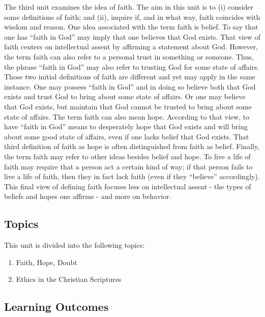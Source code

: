 \documentclass[
]{book}
\providecommand{\tightlist}{%
  \setlength{\itemsep}{0pt}\setlength{\parskip}{0pt}}
\begin{document}
The third unit examines the idea of faith. The aim in this unit is to (i) consider some definitions of faith; and (ii), inquire if, and in what way, faith coincides with wisdom and reason. One idea associated with the term faith is belief. To say that one has ``faith in God'' may imply that one believes that God exists. That view of faith centers on intellectual assent by affirming a statement about God. However, the term faith can also refer to a personal trust in something or someone. Thus, the phrase ``faith in God'' may also refer to trusting God for some state of affairs. Those two initial definitions of faith are different and yet may apply in the same instance. One may possess ``faith in God'' and in doing so believe both that God exists and trust God to bring about some state of affairs. Or one may believe that God exists, but maintain that God cannot be trusted to bring about some state of affairs. The term faith can also mean hope. According to that view, to have ``faith in God'' means to desperately hope that God exists and will bring about some good state of affairs, even if one lacks belief that God exists. That third definition of faith as hope is often distinguished from faith as belief. Finally, the term faith may refer to other ideas besides belief and hope. To live a life of faith may require that a person act a certain kind of way; if that person fails to live a life of faith, then they in fact lack faith (even if they ``believe'' accordingly). This final view of defining faith focuses less on intellectual assent - the types of beliefs and hopes one affirms - and more on behavior.

\hypertarget{topics-1}{%
\subsection*{Topics}\label{topics-1}}

This unit is divided into the following topics:

\begin{enumerate}
\def\labelenumi{\arabic{enumi}.}
\tightlist
\item
  Faith, Hope, Doubt
\item
  Ethics in the Christian Scriptures
\end{enumerate}

\hypertarget{learning-outcomes-2}{%
\subsection*{Learning Outcomes}\label{learning-outcomes-2}}
\end{document}
